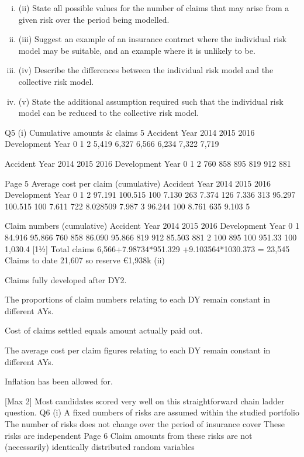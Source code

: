 \documentclass[a4paper,12pt]{article}
\begin{document}
\begin{enumerate}
\begin{enumerate}[(i)]
\item (ii) State all possible values for the number of claims that may arise from a given
risk over the period being modelled.
\item 
(iii) Suggest an example of an insurance contract where the individual risk model
may be suitable, and an example where it is unlikely to be.
\item 
(iv) Describe the differences between the individual risk model and the collective
risk model.
\item 
(v) State the additional assumption required such that the individual risk model
can be reduced to the collective risk model.
\end{enumerate}
Q5
(i)
Cumulative amounts & claims
5
Accident Year
2014
2015
2016
Development Year
0
1
2
5,419 6,327 6,566
6,234 7,322
7,719

Accident Year
2014
2015
2016
Development Year
0
1
2
760
858
895
819
912
881

Page 5%
Average cost per claim (cumulative)
Accident Year
2014
2015
2016
Development Year
0
1
2
97.191%
100.515%
100%
7.130 263
7.374 126
7.336 313
95.297%
100.515%
100%
7.611 722
8.028509
7.987 3
96.244%
100%
8.761 635
9.103 5

Claim numbers (cumulative)
Accident Year
2014
2015
2016
Development Year
0
1
84.916%
95.866%
760
858
86.090%
95.866%
819
912
85.503%
881
2
100%
895
100%
951.33
100%
1,030.4
[11⁄2]
Total claims 6,566+7.98734*951.329 +9.103564*1030.373 = 23,545
Claims to date 21,607 so reserve €1,938k
(ii)


Claims fully developed after DY2.

The proportions of claim numbers relating to each DY remain constant in
different AYs.

Cost of claims settled equals amount actually paid out.

The average cost per claim figures relating to each DY remain constant in
different AYs.

Inflation has been allowed for.

[Max 2]
Most candidates scored very well on this straightforward chain ladder
question.
Q6
(i)
A fixed numbers of risks are assumed within the studied portfolio 
The number of risks does not change over the period of insurance cover 
These risks are independent 
Page 6%
Claim amounts from these risks are not (necessarily) identically distributed
random variables


\end{enumerate}
\end{document}
